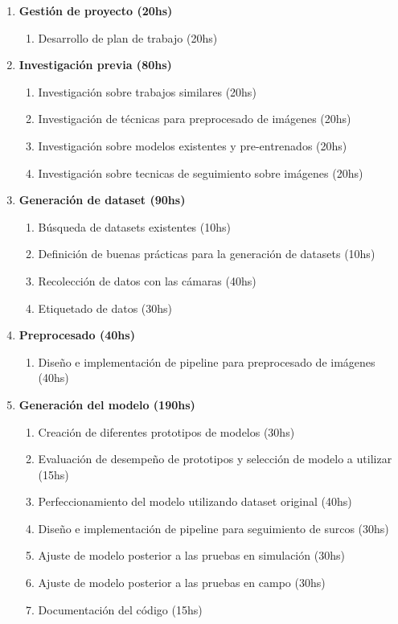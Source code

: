 \documentclass[
11pt, %
codirector, %
]{charter}
\begin{document}
\begin{enumerate}
	\item \textbf{Gestión de proyecto (20hs)}
	\begin{enumerate}
		\item Desarrollo de plan de trabajo (20hs)
	\end{enumerate}

\item \textbf{Investigación previa (80hs)}
	\begin{enumerate}
		\item Investigación sobre trabajos similares (20hs)
		\item Investigación de técnicas para preprocesado de imágenes (20hs)
		\item Investigación sobre modelos existentes y pre-entrenados (20hs)
		\item Investigación sobre tecnicas de seguimiento sobre imágenes (20hs)
	\end{enumerate}

\item \textbf{Generación de dataset (90hs)}
	\begin{enumerate}
		\item Búsqueda de datasets existentes (10hs)
		\item Definición de buenas prácticas para la generación de datasets (10hs)
		\item Recolección de datos con las cámaras (40hs)
		\item Etiquetado de datos (30hs)
	\end{enumerate}

\item \textbf{Preprocesado (40hs)}
	\begin{enumerate}
		\item Diseño e implementación de pipeline para preprocesado de imágenes (40hs)
	\end{enumerate}

\item \textbf{Generación del modelo (190hs)}
	\begin{enumerate}
		\item Creación de diferentes prototipos de modelos (30hs)
		\item Evaluación de desempeño de prototipos y selección de modelo a utilizar (15hs)
		\item Perfeccionamiento del modelo utilizando dataset original (40hs)
		\item Diseño e implementación de pipeline para seguimiento de surcos (30hs)
		\item Ajuste de modelo posterior a las pruebas en simulación (30hs)
		\item Ajuste de modelo posterior a las pruebas en campo (30hs)
		\item Documentación del código (15hs)
	\end{enumerate}


\end{enumerate}
\end{document}
